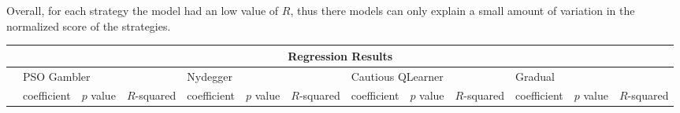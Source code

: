 Overall, for each strategy the model had an low value of \(R\), thus there models
can only explain a small amount of variation in the normalized score of the strategies.
\begin{table}[!hbtp]
	\centering
	\begin{adjustbox}{width=1\textwidth}
		\small
		\begin{tabular}{|l|l|l|l|l|l|l|l|l|l|l|l|l|}
			\toprule
			\multicolumn{13}{|c|}{\textbf{Regression Results}}                                                                       \\ \hline
			& \multicolumn{3}{l|}{PSO Gambler} & \multicolumn{3}{l|}{Nydegger} & \multicolumn{3}{l|}{Cautious QLearner} & \multicolumn{3}{l|}{Gradual} \\ \hline
			                           & coefficient  & \(p\) value & \(R\)-squared & coefficient & \(p\) value & \(R\)-squared & coefficient & \(p\) value & \(R\)-squared & coefficient     & \(p\) value & \(R\)-squared \\ \hline


\end{tabular}
\end{adjustbox}
\end{table}

